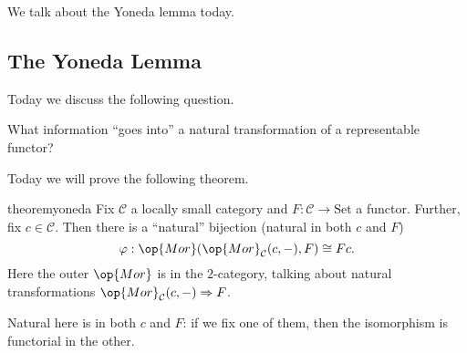 
We talk about the Yoneda lemma today.

\subsection{The Yoneda Lemma}
Today we discuss the following question.
\begin{ques}
	What information ``goes into'' a natural transformation of a representable functor?
\end{ques}
Today we will prove the following theorem.
\begin{restatable}{theorem}{yoneda} \label{thm:yoneda}
	Fix $\mathcal C$ a locally small category and $F:\mathcal C\to\mathrm{Set}$ a functor. Further, fix $c\in\mathcal C$. Then there is a ``natural'' bijection (natural in both $c$ and $F$)
	\[\varphi:\op{Mor}(\op{Mor}_\mathcal C(c,-),F)\cong Fc.\]
	Here the outer $\op{Mor}$ is in the $2$-category, talking about natural transformations $\op{Mor}_\mathcal C(c,-)\Rightarrow F$.
\end{restatable}
\noindent Natural here is in both $c$ and $F$: if we fix one of them, then the isomorphism is functorial in the other.

